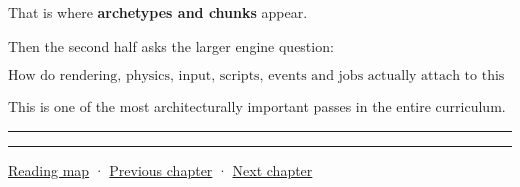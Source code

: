 That is where \textbf{archetypes and chunks} appear.

Then the second half asks the larger engine question:

\[
\boxed{
\text{How do rendering, physics, input, scripts, events and jobs actually attach to this ECS without destroying its data-oriented properties?}
}
\]

This is one of the most architecturally important passes in the entire curriculum.

\begin{center}\rule{0.5\linewidth}{0.5pt}\end{center}

\begin{center}\rule{0.5\linewidth}{0.5pt}\end{center}

\hyperref[volume-reading-map]{Reading map} · \hyperref[05-engine-i-ch014-application-clocks-and-stable-input-identity]{Previous chapter} · \hyperref[05-engine-i-ch016-archetypes-chunks-relationships-and-transforms]{Next chapter}
